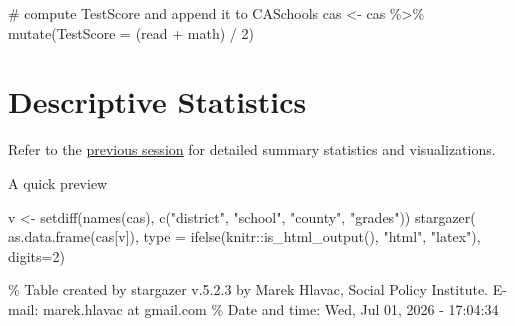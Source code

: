 \documentclass[
  12pt,
  letterpaper,
]{scrbook}
\newenvironment{Shaded}{\begin{snugshade}}{\end{snugshade}}
\newcommand{\AttributeTok}[1]{\textcolor[rgb]{0.40,0.45,0.13}{#1}}
\newcommand{\CommentTok}[1]{\textcolor[rgb]{0.37,0.37,0.37}{#1}}
\newcommand{\DecValTok}[1]{\textcolor[rgb]{0.68,0.00,0.00}{#1}}
\newcommand{\FunctionTok}[1]{\textcolor[rgb]{0.28,0.35,0.67}{#1}}
\newcommand{\NormalTok}[1]{\textcolor[rgb]{0.00,0.23,0.31}{#1}}
\newcommand{\OtherTok}[1]{\textcolor[rgb]{0.00,0.23,0.31}{#1}}
\newcommand{\SpecialCharTok}[1]{\textcolor[rgb]{0.37,0.37,0.37}{#1}}
\newcommand{\StringTok}[1]{\textcolor[rgb]{0.13,0.47,0.30}{#1}}
\theoremstyle{plain}
\theoremstyle{definition}
\theoremstyle{remark}
\begin{document}
\begin{Shaded}
\begin{Highlighting}[]
\CommentTok{\# compute TestScore and append it to CASchools}
\NormalTok{cas }\OtherTok{\textless{}{-}}\NormalTok{ cas }\SpecialCharTok{\%\textgreater{}\%}
  \FunctionTok{mutate}\NormalTok{(}\AttributeTok{TestScore =}\NormalTok{ (read }\SpecialCharTok{+}\NormalTok{ math) }\SpecialCharTok{/} \DecValTok{2}\NormalTok{)}
\end{Highlighting}
\end{Shaded}

\section{Descriptive Statistics}\label{descriptive-statistics}

Refer to the
\hyperref[descriptive-analysis-and-data-visualization-with-caschools]{previous
session} for detailed summary statistics and visualizations.

A quick preview

\begin{Shaded}
\begin{Highlighting}[]
\NormalTok{v }\OtherTok{\textless{}{-}} \FunctionTok{setdiff}\NormalTok{(}\FunctionTok{names}\NormalTok{(cas), }\FunctionTok{c}\NormalTok{(}\StringTok{"district"}\NormalTok{, }\StringTok{"school"}\NormalTok{, }\StringTok{"county"}\NormalTok{, }\StringTok{"grades"}\NormalTok{))}
\FunctionTok{stargazer}\NormalTok{(}
  \FunctionTok{as.data.frame}\NormalTok{(cas[v]), }
  \AttributeTok{type =} \FunctionTok{ifelse}\NormalTok{(knitr}\SpecialCharTok{::}\FunctionTok{is\_html\_output}\NormalTok{(), }\StringTok{"html"}\NormalTok{, }\StringTok{"latex"}\NormalTok{), }
  \AttributeTok{digits=}\DecValTok{2}\NormalTok{)}
\end{Highlighting}
\end{Shaded}

\% Table created by stargazer v.5.2.3 by Marek Hlavac, Social Policy
Institute. E-mail: marek.hlavac at gmail.com \% Date and time: Wed, Jul
01, 2026 - 17:04:34
\end{document}
